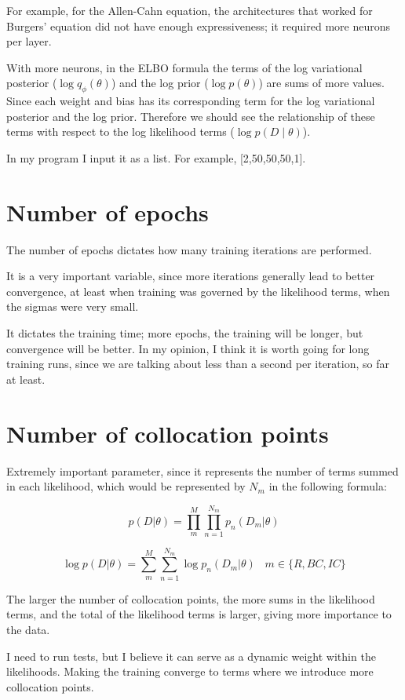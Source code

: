 \documentclass{article}
\begin{document}
For example, for the Allen-Cahn equation, the architectures that worked for Burgers' equation did not have enough expressiveness; it required more neurons per layer.

With more neurons, in the ELBO formula the terms of the log variational posterior ($\log{q_{\phi}(\theta)}$) and the log prior ($\log p(\theta)$) are sums of more values. Since each weight and bias has its corresponding term for the log variational posterior and the log prior. Therefore we should see the relationship of these terms with respect to the log likelihood terms ($\log p(D\mid\theta)$).

In my program I input it as a list. For example, [2,50,50,50,1].

\section{Number of epochs}

The number of epochs dictates how many training iterations are performed.

It is a very important variable, since more iterations generally lead to better convergence, at least when training was governed by the likelihood terms, when the sigmas were very small.

It dictates the training time; more epochs, the training will be longer, but convergence will be better. In my opinion, I think it is worth going for long training runs, since we are talking about less than a second per iteration, so far at least.

\section{Number of collocation points}

Extremely important parameter, since it represents the number of terms summed in each likelihood, which would be represented by $N_m$ in the following formula:

$$
p(D|\theta) = \prod_{m}^{M}\prod_{n=1}^{N_m} p_n(D_m|\theta)
$$

$$
\log p(D|\theta) = \sum_{m}^{M} \sum_{n=1}^{N_m} \log p_n(D_{m}|\theta) \;\;\;m\in \{R, BC, IC\}
$$

The larger the number of collocation points, the more sums in the likelihood terms, and the total of the likelihood terms is larger, giving more importance to the data.

I need to run tests, but I believe it can serve as a dynamic weight within the likelihoods. Making the training converge to terms where we introduce more collocation points.
\end{document}
